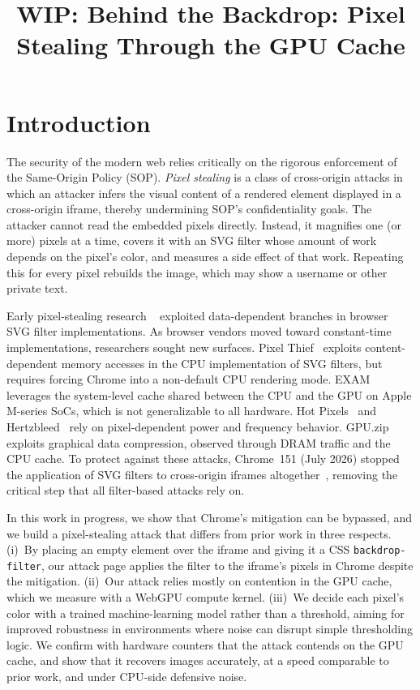 \documentclass[letterpaper,twocolumn,10pt]{article}
\title{WIP: Behind the Backdrop: Pixel Stealing Through the GPU Cache}
\author{}
\date{}
\begin{document}
\maketitle

\section{Introduction}

The security of the modern web relies critically on the rigorous enforcement of the Same-Origin
Policy (SOP). \emph{Pixel stealing} is a class of cross-origin attacks in which an attacker infers the visual content of a rendered element displayed in a cross-origin iframe, thereby undermining SOP's confidentiality goals. The attacker cannot read the embedded pixels directly. Instead, it magnifies one (or more) pixels at a time, covers it with an SVG filter whose amount of work depends on the pixel's color, and measures a side effect of that work. Repeating this for every pixel rebuilds the image, which may show a username or other private text.

Early pixel-stealing research ~\cite{Stone2013PixelPerfectTiming} exploited
data-dependent branches in browser SVG filter implementations. As browser vendors moved toward
constant-time implementations, researchers sought new surfaces. Pixel Thief~\cite{pixelthiefsec24} exploits content-dependent memory accesses in the CPU implementation of SVG filters, but requires forcing Chrome into a non-default CPU rendering mode. EXAM~\cite{xu2025exam} leverages the system-level cache shared between the CPU and the GPU on Apple M-series SoCs, which is not generalizable to all hardware. Hot Pixels~\cite{taneja2023hotPixels} and Hertzbleed~\cite{Hertzbleedsp23} rely on pixel-dependent power and frequency behavior. GPU.zip~\cite{gpuzip} exploits graphical data compression,
observed through DRAM traffic and the CPU cache. To protect against these attacks, Chrome~151 (July 2026) stopped the application of SVG filters to cross-origin iframes altogether~\cite{chromestatus}, removing the critical step that all filter-based attacks rely on.

In this work in progress, we show that Chrome's mitigation can be bypassed, and we build a
pixel-stealing attack that differs from prior work in three respects. (i)~By placing an empty
element over the iframe and giving it a CSS \texttt{backdrop-filter}, our attack page applies the filter to the iframe's pixels in Chrome despite the mitigation. (ii)~Our attack relies mostly on contention in the GPU cache, which we measure with a WebGPU compute kernel. (iii)~We decide each pixel's color with a trained machine-learning model rather than a threshold, aiming for improved robustness in environments where noise can disrupt simple thresholding logic. We confirm with hardware counters that the attack contends on the GPU cache, and show that it recovers images accurately, at a speed comparable to prior work, and under CPU-side defensive noise.
\end{document}
